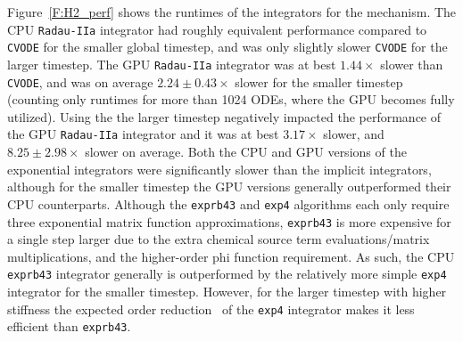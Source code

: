 \documentclass[preprint]{elsarticle}
\begin{document}
Figure~\ref{F:H2_perf} shows the runtimes of the integrators for the  mechanism.
The CPU \texttt{Radau-IIa} integrator had roughly equivalent performance compared to \texttt{CVODE} for the smaller global timestep, and was only slightly slower \texttt{CVODE} for the larger timestep.
The GPU \texttt{Radau-IIa} integrator was at best $1.44\times$ slower than \texttt{CVODE}, and was on average $2.24\pm0.43\times$ slower for the smaller timestep (counting only runtimes for more than 1024 ODEs, where the GPU becomes fully utilized).
Using the the larger timestep negatively impacted the performance of the GPU \texttt{Radau-IIa} integrator and it was at best $3.17\times$ slower, and $8.25\pm2.98\times$ slower on average.
Both the CPU and GPU versions of the exponential integrators were significantly slower than the implicit integrators, although for the smaller timestep the GPU versions generally outperformed their CPU counterparts.
Although the \texttt{exprb43} and \texttt{exp4} algorithms each only require three exponential matrix function approximations, \texttt{exprb43} is more expensive for a single step larger due to the extra chemical source term evaluations\slash matrix multiplications, and the higher-order phi function requirement.
As such, the CPU \texttt{exprb43} integrator generally is outperformed by the relatively more simple \texttt{exp4} integrator for the smaller timestep.
However, for the larger timestep with higher stiffness the expected order reduction~\cite{Bisetti:2012jw} of the \texttt{exp4} integrator makes it less efficient than \texttt{exprb43}.
\end{document}

